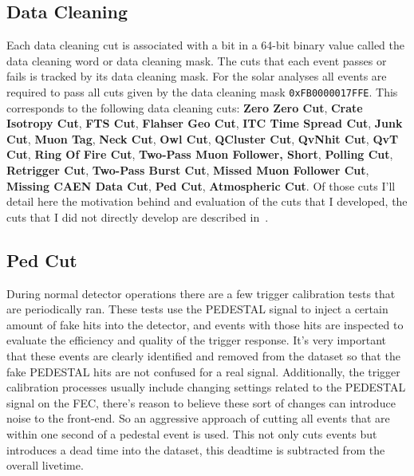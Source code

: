 \ifpdf
    \graphicspath{{backmatter/figures/PNG/}{backmatter/figures/PDF/}{backmatter/figures/}}
\else
    \graphicspath{{backmatter/figures/EPS/}{backmatter/figures/}}
\fi


\begin{appendices}
\chapter{Data Cleaning}
    \label{sec:dc_appen}
Each data cleaning cut is associated with a bit in a 64-bit binary value called
the data cleaning word or data cleaning mask.
The cuts that each event passes or fails is tracked by its data cleaning mask.
For the solar analyses all events are required to pass all cuts
given by the data cleaning mask \texttt{0xFB0000017FFE}.
This corresponds to the following data cleaning cuts:
    \textbf{Zero Zero Cut},
    \textbf{Crate Isotropy Cut},
    \textbf{FTS Cut},
    \textbf{Flahser Geo Cut},
    \textbf{ITC Time Spread Cut},
    \textbf{Junk Cut},
    \textbf{Muon Tag},
    \textbf{Neck Cut},
    \textbf{Owl Cut},
    \textbf{QCluster Cut},
    \textbf{QvNhit Cut},
    \textbf{QvT Cut},
    \textbf{Ring Of Fire Cut},
    \textbf{Two-Pass Muon Follower, Short},
    \textbf{Polling Cut},
    \textbf{Retrigger Cut},
    \textbf{Two-Pass Burst Cut},
    \textbf{Missed Muon Follower Cut},
    \textbf{Missing CAEN Data Cut},
    \textbf{Ped Cut},
    \textbf{Atmospheric Cut}.
Of those cuts I'll detail here the motivation behind and evaluation of the
cuts that I developed, the cuts that I did not directly develop are described in~\citep{dc_document}.

\section{Ped Cut}
During normal detector operations there are a few trigger calibration
tests that are periodically ran.
These tests use the PEDESTAL signal to inject a certain amount of fake hits
into the detector, and events with those hits are inspected to evaluate the efficiency and
quality of the trigger response.
It's very important that these events are clearly identified and removed from the
dataset so that the fake PEDESTAL hits are not confused for a real signal.
Additionally, the trigger calibration processes usually include changing settings
related to the PEDESTAL signal on the FEC, there's reason to believe these sort
of changes can introduce noise to the front-end.
So an aggressive approach of cutting all events that are within one second of
a pedestal event is used.
This not only cuts events but introduces a dead time into the dataset,
this deadtime is subtracted from the overall livetime.


\end{appendices}
